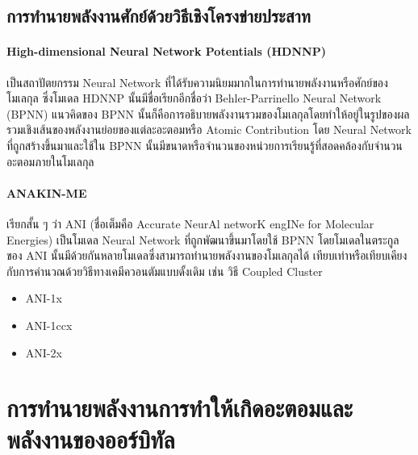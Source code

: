 \subsection{การทำนายพลังงานศักย์ด้วยวิธีเชิงโครงข่ายประสาท}
\label{ssec:pred_pot_ener_nn}

\paragraph{High-dimensional Neural Network Potentials (HDNNP)}\autocite{behler2007} เป็นสถาปัตยกรรม Neural Network 
ที่ได้รับความนิยมมากในการทำนายพลังงานหรือศักย์ของโมเลกุล ซึ่งโมเดล HDNNP นั้นมีชื่อเรียกอีกชื่อว่า Behler-Parrinello Neural Network 
(BPNN) แนวคิดของ BPNN นั้นก็คือการอธิบายพลังงานรวมของโมเลกุลโดยทำให้อยู่ในรูปของผลรวมเชิงเส้นของพลังงานย่อยของแต่ละอะตอมหรือ 
Atomic Contribution โดย Neural Network ที่ถูกสร้างขึ้นมาและใช้ใน BPNN นั้นมีขนาดหรือจำนวนของหน่วยการเรียนรู้ที่สอดคล้องกับจำนวน%
อะตอมภายในโมเลกุล

\paragraph{ANAKIN-ME} เรียกสั้น ๆ ว่า ANI (ชื่อเต็มคือ Accurate NeurAl networK engINe for Molecular Energies) เป็นโมเดล 
Neural Network ที่ถูกพัฒนาขึ้นมาโดยใช้ BPNN โดยโมเดลในตระกูลของ ANI นั้นมีด้วยกันหลายโมเดลซึ่งสามารถทำนายพลังงานของโมเลกุลได้%
เทียบเท่าหรือเทียบเคียงกับการคำนวณด้วยวิธีทางเคมีควอนตัมแบบดั้งเดิม เช่น วิธี Coupled Cluster

\begin{itemize}
    \item ANI-1x\autocite{smith2017}
    
    \item ANI-1ccx\autocite{smith2018}
    
    \item ANI-2x\autocite{smith2019,devereux2020}
\end{itemize}

\section{การทำนายพลังงานการทำให้เกิดอะตอมและพลังงานของออร์บิทัล}
\label{sec:pred_ener_atom_orb}

